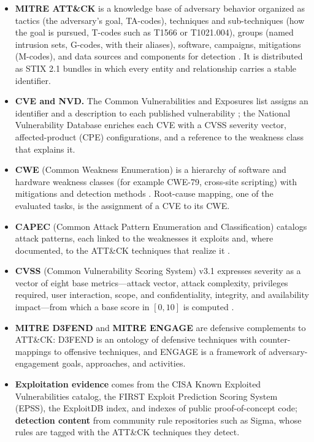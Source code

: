 \documentclass[twocolumn]{svjour3}
\begin{document}
\begin{itemize}
\item \textbf{MITRE ATT\&CK} is a knowledge base of adversary behavior organized as tactics (the adversary's goal, TA-codes), techniques and sub-techniques (how the goal is pursued, T-codes such as T1566 or T1021.004), groups (named intrusion sets, G-codes, with their aliases), software, campaigns, mitigations (M-codes), and data sources and components for detection \cite{strom2018mitre}. It is distributed as STIX 2.1 bundles in which every entity and relationship carries a stable identifier.
\item \textbf{CVE and NVD.} The Common Vulnerabilities and Exposures list assigns an identifier and a description to each published vulnerability \cite{mitreCVE}; the National Vulnerability Database enriches each CVE with a CVSS severity vector, affected-product (CPE) configurations, and a reference to the weakness class that explains it.
\item \textbf{CWE} (Common Weakness Enumeration) is a hierarchy of software and hardware weakness classes (for example CWE-79, cross-site scripting) with mitigations and detection methods \cite{mitreCWE}. Root-cause mapping, one of the evaluated tasks, is the assignment of a CVE to its CWE.
\item \textbf{CAPEC} (Common Attack Pattern Enumeration and Classification) catalogs attack patterns, each linked to the weaknesses it exploits and, where documented, to the ATT\&CK techniques that realize it \cite{mitreCAPEC}.
\item \textbf{CVSS} (Common Vulnerability Scoring System) v3.1 expresses severity as a vector of eight base metrics---attack vector, attack complexity, privileges required, user interaction, scope, and confidentiality, integrity, and availability impact---from which a base score in $[0,10]$ is computed \cite{first2019cvss}.
\item \textbf{MITRE D3FEND} and \textbf{MITRE ENGAGE} are defensive complements to ATT\&CK: D3FEND is an ontology of defensive techniques with counter-mappings to offensive techniques, and ENGAGE is a framework of adversary-engagement goals, approaches, and activities.
\item \textbf{Exploitation evidence} comes from the CISA Known Exploited Vulnerabilities catalog, the FIRST Exploit Prediction Scoring System (EPSS), the ExploitDB index, and indexes of public proof-of-concept code; \textbf{detection content} from community rule repositories such as Sigma, whose rules are tagged with the ATT\&CK techniques they detect.
\end{itemize}
\end{document}
